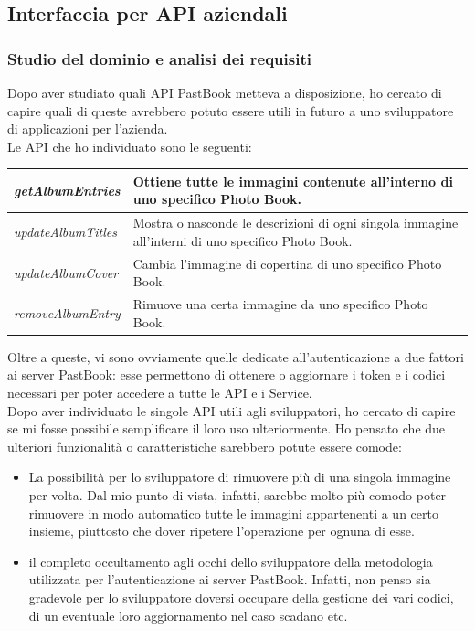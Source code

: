 		\subsection{Interfaccia per API aziendali}
			\subsubsection{Studio del dominio e analisi dei requisiti}
				Dopo aver studiato quali API PastBook metteva a disposizione, ho cercato di capire quali di queste avrebbero potuto
				essere utili in futuro a uno sviluppatore di applicazioni per l'azienda.\\
				Le API che ho individuato sono le seguenti:
				\begin{center}
					\begin{tabular}[H]{p{} p{}}
						\emph{getAlbumEntries}		& Ottiene tutte le immagini contenute all'interno di uno specifico
										  Photo Book.\\
						\hline
						\emph{updateAlbumTitles}	& Mostra o nasconde le descrizioni di ogni singola immagine
										  all'interni di uno specifico Photo Book.\\
						\hline
						\emph{updateAlbumCover}		& Cambia l'immagine di copertina di uno specifico Photo Book.\\
						\hline
						\emph{removeAlbumEntry}		& Rimuove una certa immagine da uno specifico Photo Book.\\
					\end{tabular}
				\end{center}
				Oltre a queste, vi sono ovviamente quelle dedicate all'autenticazione a due fattori ai server PastBook: esse
				permettono di ottenere o aggiornare i token e i codici necessari per poter accedere a tutte le API e i Service.\\
				Dopo aver individuato le singole API utili agli sviluppatori, ho cercato di capire se mi fosse possibile semplificare
				il loro uso ulteriormente. Ho pensato che due ulteriori funzionalità o caratteristiche sarebbero potute essere
				comode:
				\begin{itemize}
					\item La possibilità per lo sviluppatore di rimuovere più di una singola immagine per volta. Dal mio punto di
					vista, infatti, sarebbe molto più comodo poter rimuovere in modo automatico tutte le immagini appartenenti a
					un certo insieme, piuttosto che dover ripetere l'operazione per ognuna di esse.
					\item il completo occultamento agli occhi dello sviluppatore della metodologia utilizzata per
					l'autenticazione ai server PastBook. Infatti, non penso sia gradevole per lo sviluppatore doversi occupare
					della gestione dei vari codici, di un eventuale loro aggiornamento nel caso scadano etc.
				\end{itemize}

